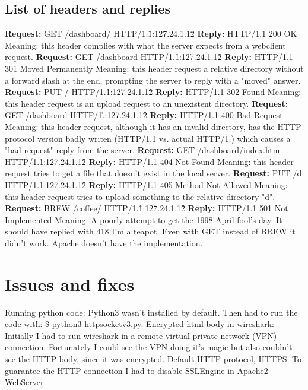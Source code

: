 \documentclass[11pt,a4paper]{report}
\begin{document}
    \subsection{List of headers and replies}
            \textbf{Request:} GET /dashboard/ HTTP/1.1\r\nHost:127.24.1.12\r\n\r\n
            \textbf{Reply:} HTTP/1.1 200 OK
                Meaning: this header complies with what the server expects from a webclient request.
            \textbf{Request:} GET /dashboard HTTP/1.1\r\nHost:127.24.1.12\r\n\r\n
            \textbf{Reply:} HTTP/1.1 301 Moved Permanently
                Meaning: this header request a relative directory without a forward slash at the end, prompting the server to reply with a "moved" answer.
            \textbf{Request:} PUT / HTTP/1.1\r\nHost:127.24.1.12\r\n\r\n
            \textbf{Reply:} HTTP/1.1 302 Found
                Meaning: this header request is an upload request to an unexistent directory.
            \textbf{Request:} GET /dashboard HTTP/1.\r\nHost:127.24.1.12\r\n\r\n
            \textbf{Reply:} HTTP/1.1 400 Bad Request
                Meaning: this header request, although it has an invalid directory, has the HTTP protocol version badly writen (HTTP/1.1 vs. actual HTTP/1.) which causes a "bad request" reply from the server.
            \textbf{Request:} GET /dashboard/index.htm HTTP/1.1\r\nHost:127.24.1.12\r\n\r\n
            \textbf{Reply:} HTTP/1.1 404 Not Found
                Meaning: this header request tries to get a file that doesn't exist in the local server.
            \textbf{Request:} PUT /d HTTP/1.1\r\nHost:127.24.1.12\r\n\r\n
            \textbf{Reply:} HTTP/1.1 405 Method Not Allowed
                Meaning: this header request tries to upload something to the relative directory "d".
            \textbf{Request:} BREW /coffee/ HTTP/1.1\r\nHost:127.24.1.12\r\n\r\n
            \textbf{Reply:} HTTP/1.1 501 Not Implemented
                Meaning: A poorly attempt to get the 1998 April fool's day. It should have replied with 418 I'm a teapot. Even with GET instead of BREW it didn't work. Apache doesn't have the implementation.

\section{Issues and fixes}
    Running python code:
        Python3 wasn't installed by default. Then had to run the code with: \$ python3 httpsocketv3.py.
    Encrypted html body in wireshark:
        Initially I had to run wireshark in a remote virtual private network (VPN) connection. Fortunately I could see the VPN doing it's magic but also couldn't see the HTTP body, since it was encrypted.
    Default HTTP protocol, HTTPS:
        To guarantee the HTTP connection I had to disable SSLEngine in Apache2 WebServer.
\end{document}
